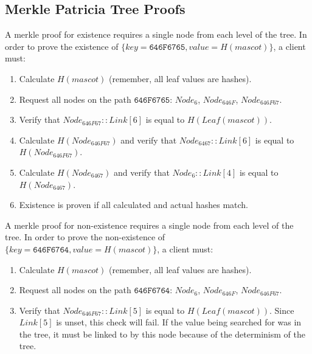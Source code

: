 \subsection{Merkle Patricia Tree Proofs}

A merkle proof for existence requires a single node from each level of the tree.
In order to prove the existence of $\{key = \texttt{646F6765}, value = H(mascot)\}$, a client must:
\begin{enumerate}
	\item{Calculate $H(mascot)$ (remember, all leaf values are hashes).}
	\item{Request all nodes on the path $\texttt{646F6765}$: $Node_{6}$, $Node_{646F}$, $Node_{646F67}$.}
	\item{Verify that $Node_{646F67}::Link[6]$ is equal to $H(Leaf(mascot))$.}
	\item{Calculate $H(Node_{646F67})$ and verify that $Node_{6467}::Link[6]$ is equal to $H(Node_{646F67})$.}
	\item{Calculate $H(Node_{6467})$ and verify that $Node_{6}::Link[4]$ is equal to $H(Node_{6467})$.}
	\item{Existence is proven if all calculated and actual hashes match.}
\end{enumerate}

A merkle proof for non-existence requires a single node from each level of the tree.
In order to prove the non-existence of $\{key = \texttt{646F6764}, value = H(mascot)\}$, a client must:
\begin{enumerate}
	\item{Calculate $H(mascot)$ (remember, all leaf values are hashes).}
	\item{Request all nodes on the path $\texttt{646F6764}$: $Node_{6}$, $Node_{646F}$, $Node_{646F67}$.}
	\item{
		Verify that $Node_{646F67}::Link[5]$ is equal to $H(Leaf(mascot))$.
		Since $Link[5]$ is unset, this check will fail.
		If the value being searched for was in the tree, it must be linked to by this node because of the determinism of the tree.
	 }
\end{enumerate}
